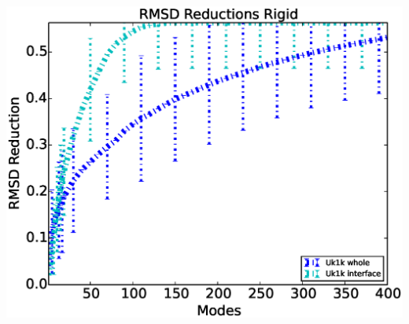 \documentclass[11pt]{article}
\begin{document}
\clearpage%
\includegraphics[width=\textwidth]{./postanalysis/pics/2b_individual_canonical_whole_bb_align2bindividual_results/plots/RMSDReductionAssessmentWholeRigid.eps}
\clearpage%
\end{document}
